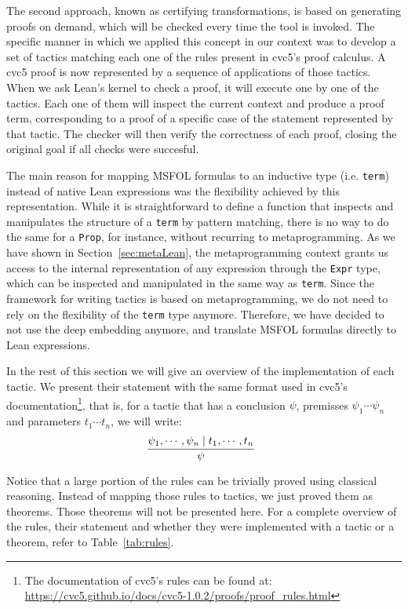 The second approach, known as certifying
transformations, is based on generating proofs on demand, which will be checked
every time the tool is invoked. The specific manner in which we applied
this concept in our context was to develop a set of tactics matching
each one of the rules present in cvc5's proof calculus.
A cvc5 proof is now represented by a sequence of applications of those tactics.
When we ask Lean's kernel to check a proof, it will execute one by one
of the tactics. Each one of them will inspect the current context
and produce a proof term, corresponding to a proof of a specific
case of the statement represented by that tactic. The checker will then
verify the correctness of each proof, closing the original goal if all
checks were succesful.

The main reason for mapping MSFOL formulas to an inductive type (i.e. \texttt{term})
instead of native Lean expressions was the flexibility achieved by this representation.
While it is straightforward to define a function that inspects and manipulates the
structure of
a \texttt{term} by pattern matching, there is no way to do the same for a \texttt{Prop},
for instance, without recurring to metaprogramming. As we have shown in
Section~\ref{sec:metaLean},
the metaprogramming context grants us access to the internal representation of any
expression
through the \texttt{Expr} type, which can be inspected and manipulated in the same way
as \texttt{term}. Since the framework for writing tactics is based on metaprogramming, we
do not need to rely on the flexibility of the \texttt{term} type anymore. Therefore, we
have decided to not use the deep embedding anymore, and translate MSFOL formulas directly
to Lean expressions.

In the rest of this section we will give an overview of the implementation of each tactic.
We present their statement with the same format used in cvc5's documentation\footnote{The documentation of cvc5's rules can be found at:
  \url{https://cvc5.github.io/docs/cvc5-1.0.2/proofs/proof_rules.html}}, that is,
for a tactic that has a conclusion $\psi$, premisses $\psi_{1} \cdots \psi_{n}$ and
parameters $t_{1} \cdots t_{n}$, we will write:
\[
  \infer[]{\psi}{\psi_{1}, \cdots, \psi_{n} \mid t_{1}, \cdots, t_{n}}
\]

Notice that a large portion of the rules can be trivially proved using classical
reasoning. Instead of mapping those rules to tactics, we just proved them as theorems.
Those theorems will not be presented here. For a complete overview of the rules, their statement and whether they were implemented with a tactic or a
theorem, refer to Table~\ref{tab:rules}.


